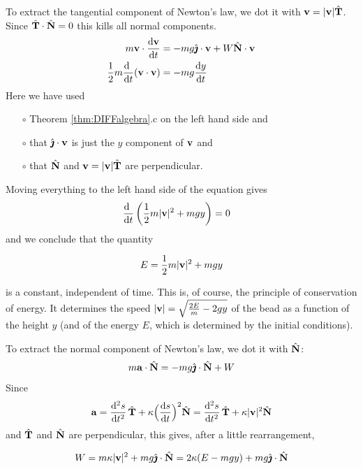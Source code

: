 To extract the tangential component of Newton's law, we dot it with 
$\mathbf{v}=|\mathbf{v}|\hat{\mathbf{T}}$. Since $\hat{\mathbf{T}}\cdot\hat{\mathbf{N}}=0$ this kills all normal 
components.
\begin{align*}
m\vv\cdot\diff{\vv}{t}
&=-mg\hj\cdot\vv+W\hat\vN\cdot\vv\\
\frac{1}{2}m\diff{\ }{t}(\vv\cdot\vv)&=-mg\diff{y}{t}
\end{align*}
Here we have used 
\begin{itemize}\itemsep1pt \parskip0pt  %
\item[$\circ$]
Theorem \ref{thm:DIFFalgebra}.c on the left hand side and
\item[$\circ$]
that $\hat{\pmb{\jmath}}\cdot\mathbf{v}$ is just the $y$ component of $\mathbf{v}$ and
\item[$\circ$]
that $\hat{\mathbf{N}}$ and $\mathbf{v}=|\mathbf{v}|\hat{\mathbf{T}}$ are perpendicular. 
\end{itemize}
Moving everything to the left hand side of the equation gives 
\begin{align*}
\diff{\ }{t}\left(\frac{1}{2}m|\vv|^2+mgy\right)&=0
\end{align*}
and we conclude that the quantity
\begin{impeqn}\label{eqn:consEnergy}
\begin{equation*}
E=\frac{1}{2}m|\mathbf{v}|^2+mgy
\end{equation*}
\end{impeqn}\noindent
is a constant, independent of time. This is, of course, the 
principle of conservation of 
energy. It determines the speed $|\mathbf{v}|=\sqrt{\frac{2E}{m}-2gy}$ of
the bead as a function of the height $y$ (and of the energy $E$, 
which is determined by the initial conditions).

To extract the normal component of Newton's law, 
we dot it with $\hat{\mathbf{N}}$:
\begin{equation*}
m\mathbf{a}\cdot \hat{\mathbf{N}}=-mg\hat{\pmb{\jmath}}\cdot \hat{\mathbf{N}}+W
\end{equation*}
Since 
\begin{equation*}
\va=\difftwo{s}{t}\,\hat\vT+\ka\Big(\diff{s}{t}\Big)^2\hat\vN
=\difftwo{s}{t}\,\hat\vT+\ka|\vv|^2\hat\vN
\end{equation*}
and $\hat{\mathbf{T}}$ and $\hat{\mathbf{N}}$ are perpendicular, this gives, after a little
rearrangement,
\begin{impeqn}\label{eqn:normalForce}
\begin{equation*}
W=m\kappa|\mathbf{v}|^2+mg\hat{\pmb{\jmath}}\cdot \hat{\mathbf{N}}
=2\kappa(E-mgy)+mg\hat{\pmb{\jmath}}\cdot \hat{\mathbf{N}}
\end{equation*}
\end{impeqn}

